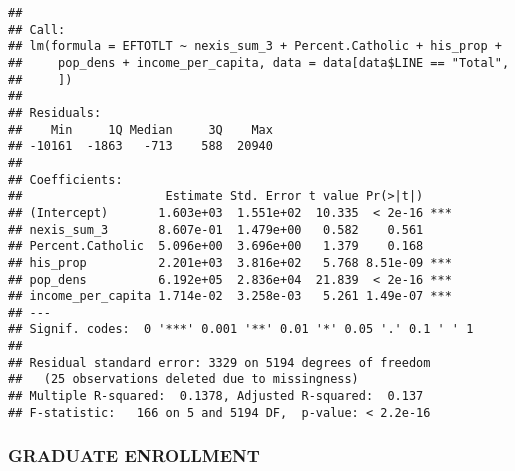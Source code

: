 \documentclass[]{article}
\newenvironment{Shaded}{\begin{snugshade}}{\end{snugshade}}
\newcommand{\KeywordTok}[1]{\textcolor[rgb]{0.13,0.29,0.53}{\textbf{#1}}}
\newcommand{\DataTypeTok}[1]{\textcolor[rgb]{0.13,0.29,0.53}{#1}}
\newcommand{\DecValTok}[1]{\textcolor[rgb]{0.00,0.00,0.81}{#1}}
\newcommand{\StringTok}[1]{\textcolor[rgb]{0.31,0.60,0.02}{#1}}
\newcommand{\OperatorTok}[1]{\textcolor[rgb]{0.81,0.36,0.00}{\textbf{#1}}}
\newcommand{\NormalTok}[1]{#1}
\begin{document}
\begin{verbatim}
## 
## Call:
## lm(formula = EFTOTLT ~ nexis_sum_3 + Percent.Catholic + his_prop + 
##     pop_dens + income_per_capita, data = data[data$LINE == "Total", 
##     ])
## 
## Residuals:
##    Min     1Q Median     3Q    Max 
## -10161  -1863   -713    588  20940 
## 
## Coefficients:
##                    Estimate Std. Error t value Pr(>|t|)    
## (Intercept)       1.603e+03  1.551e+02  10.335  < 2e-16 ***
## nexis_sum_3       8.607e-01  1.479e+00   0.582    0.561    
## Percent.Catholic  5.096e+00  3.696e+00   1.379    0.168    
## his_prop          2.201e+03  3.816e+02   5.768 8.51e-09 ***
## pop_dens          6.192e+05  2.836e+04  21.839  < 2e-16 ***
## income_per_capita 1.714e-02  3.258e-03   5.261 1.49e-07 ***
## ---
## Signif. codes:  0 '***' 0.001 '**' 0.01 '*' 0.05 '.' 0.1 ' ' 1
## 
## Residual standard error: 3329 on 5194 degrees of freedom
##   (25 observations deleted due to missingness)
## Multiple R-squared:  0.1378, Adjusted R-squared:  0.137 
## F-statistic:   166 on 5 and 5194 DF,  p-value: < 2.2e-16
\end{verbatim}

\subsubsection{GRADUATE ENROLLMENT}\label{graduate-enrollment-1}

\begin{Shaded}
\end{Shaded}
\end{document}
